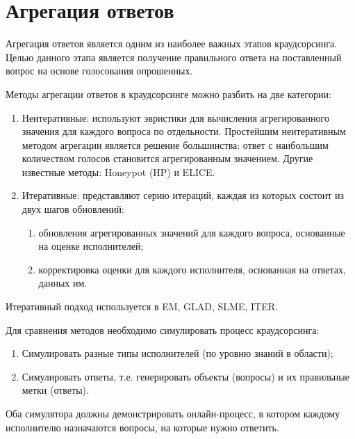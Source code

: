\documentclass[specification,annotation,times]{itmo-student-thesis}
\begin{document}
\section{Агрегация ответов}
Агрегация ответов является одним из наиболее важных этапов краудсорсинга. Целью данного этапа является получение правильного ответа на поставленный вопрос на основе голосования опрошенных.

Методы агрегации ответов в краудсорсинге можно разбить на две категории:
\begin{enumerate}
    \item Неитеративные: используют эвристики для вычисления агрегированного значения для каждого вопроса по отдельности. Простейшим неитеративным методом агрегации является решение большинства: ответ с наибольшим количеством голосов становится агрегированным значением. Другие известные методы: Honeypot (HP) и ELICE.
    \item Итеративные: представляют серию итераций, каждая из которых состоит из двух шагов обновлений:
    \begin{enumerate}
        \item обновления агрегированных значений для каждого вопроса, основанные на оценке исполнителей;
        \item корректировка оценки для каждого исполнителя, основанная на ответах, данных им.
    \end{enumerate}    
\end{enumerate}
Итеративный подход используется в EM, GLAD, SLME, ITER.

Для сравнения методов необходимо симулировать процесс краудсорсинга:
\begin{enumerate}
    \item Симулировать разные типы исполнителей (по уровню знаний в области);
    \item Симулировать ответы, т.е. генерировать объекты (вопросы) и их правильные метки (ответы).
\end{enumerate}
Оба симулятора должны демонстрировать онлайн-процесс, в котором каждому исполнителю назначаются вопросы, на которые нужно ответить.
\end{document}
